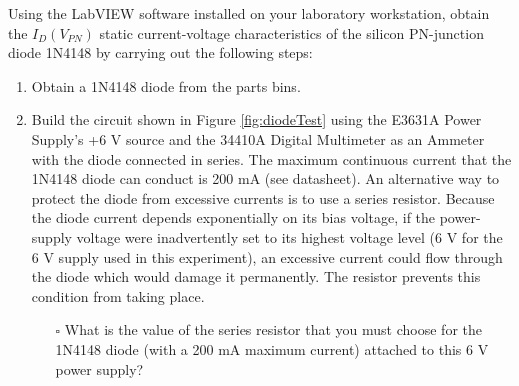 \documentclass[12pt]{../manual}
\begin{document}
Using the LabVIEW software installed on your laboratory workstation, obtain the $I_D(V_{PN})$ static current-voltage characteristics of the silicon PN-junction diode 1N4148 by carrying out the following steps:
\begin{enumerate}
\item Obtain a 1N4148 diode from the parts bins.
\item Build the circuit shown in Figure \ref{fig:diodeTest} using the E3631A Power Supply's +6 V source and the 34410A Digital Multimeter as an Ammeter with the diode connected in series. The maximum continuous current that the 1N4148 diode can conduct is 200 mA (see datasheet). An alternative way to protect the diode from excessive currents is to use a series resistor. Because the diode current depends exponentially on its bias voltage, if the power-supply voltage were inadvertently set to its highest voltage level (6 V for the 6 V supply used in this experiment), an excessive current could flow through the diode which would damage it permanently. The resistor prevents this condition from taking place. 

\begin{itemize}
\item[$\square$] What is the value of the series resistor that you must choose for the 1N4148 diode (with a 200 mA maximum current) attached to this 6 V power supply?
\end{itemize}


\end{enumerate}
\end{document}
